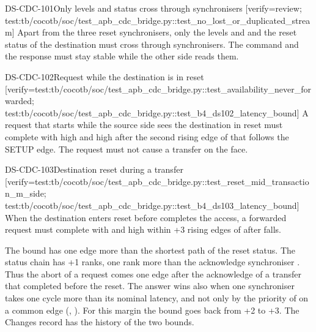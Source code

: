 \begin{requirement}{DS-CDC-101}{Only levels and status cross through synchronisers}
[verify={review; test:tb/cocotb/soc/test_apb_cdc_bridge.py::test_no_lost_or_duplicated_stream}]
Apart from the three reset synchronisers, only the levels  and  and the reset status of the destination must cross through synchronisers. The command and the response must stay stable while the other side reads them.
\end{requirement}

\begin{requirement}{DS-CDC-102}{Request while the destination is in reset}
[verify={test:tb/cocotb/soc/test_apb_cdc_bridge.py::test_availability_never_forwarded; test:tb/cocotb/soc/test_apb_cdc_bridge.py::test_b4_ds102_latency_bound}]
A request that starts while the source side sees the destination in reset must complete with  high and  high after the second rising edge of  that follows the SETUP edge. The request must not cause a transfer on the  face.
\end{requirement}

\begin{requirement}{DS-CDC-103}{Destination reset during a transfer}
[verify={test:tb/cocotb/soc/test_apb_cdc_bridge.py::test_reset_mid_transaction_m_side; test:tb/cocotb/soc/test_apb_cdc_bridge.py::test_b4_ds103_latency_bound}]
When the destination enters reset before  completes the access, a forwarded request must complete with  and  high within +3 rising edges of  after  falls.
\end{requirement}

\begin{rationale}
The bound has one edge more than the shortest path of the reset status. The status chain  has +1 ranks, one rank more than the acknowledge synchroniser . Thus the abort of a request comes one edge after the acknowledge of a transfer that completed before the reset. The answer wins also when one synchroniser takes one cycle more than its nominal latency, and not only by the priority of  on a common edge (, ). For this margin the bound goes back from +2 to +3. The Changes record has the history of the two bounds.
\end{rationale}

